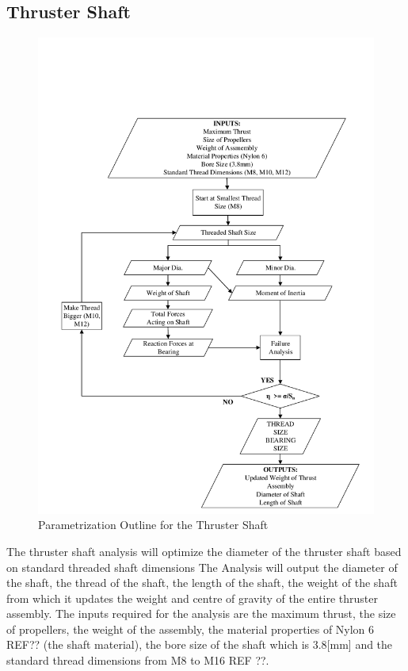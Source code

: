 \documentclass[../main.tex]{subfiles}
\begin{document}
\subsection{Thruster Shaft} \label{thrustShaft}

\begin{figure}[H]
	\centering
	\includegraphics[width=.9\linewidth]{img/paramaterization/thrusterShaft.pdf}
	\caption{Parametrization Outline for the Thruster Shaft}
	\label{fig:ThrusterShaftParametrization}
\end{figure}

The thruster shaft analysis will optimize the diameter of the thruster shaft based on standard threaded shaft dimensions The Analysis will output the diameter of the shaft, the thread of the shaft, the length of the shaft, the weight of the shaft from which it updates the weight and centre of gravity of the entire thruster assembly. The inputs required for the analysis are the maximum thrust, the size of propellers, the weight of the assembly, the material properties of Nylon 6 REF?? (the shaft material), the bore size of the shaft which is 3.8[mm] and the standard thread dimensions from M8 to M16 REF ??.\\
\end{document}

